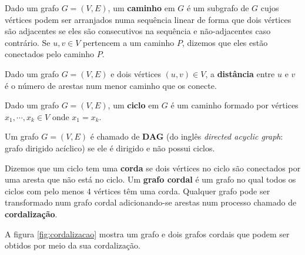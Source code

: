 \vspace{2em}

Dado um grafo $G = (V, E)$, um \textbf{caminho} em $G$ é um subgrafo de $G$ cujos vértices podem ser arranjados numa sequência linear de forma que dois vértices são adjacentes se eles são consecutivos na sequência e não-adjacentes caso contrário. Se $u, v \in V$ pertencem a um caminho $P$, dizemos que eles estão conectados pelo caminho $P$.

\vspace{2em}

Dado um grafo $G = (V, E)$ e dois vértices $(u, v) \in V$, a \textbf{distância} entre $u$ e $v$ é o número de arestas num menor caminho que os conecte.

\vspace{2em}

Dado um grafo $G = (V, E)$, um \textbf{ciclo} em $G$ é um caminho formado por vértices $x_1, \cdots, x_k \in V$ onde $x_1 = x_k$.

\vspace{2em}

Um grafo $G = (V, E)$ é chamado de \textbf{DAG} (do inglês \emph{directed acyclic graph}: grafo dirigido acíclico) se ele é dirigido e não possui ciclos.

\vspace{2em}

Dizemos que um ciclo tem uma \textbf{corda} se dois vértices no ciclo são conectados por uma aresta que não está no ciclo. Um \textbf{grafo cordal} é um grafo no qual todos os ciclos com pelo menos $4$ vértices têm uma corda. Qualquer grafo pode ser transformado num grafo cordal adicionando-se arestas num processo chamado de \textbf{cordalização}.

A figura \ref{fig:cordalizacao} mostra um grafo e dois grafos cordais que podem ser obtidos por meio da sua cordalização.

